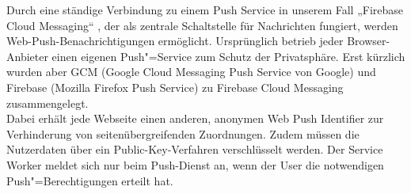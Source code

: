 Durch eine ständige Verbindung zu einem Push Service in unserem Fall „Firebase Cloud Messaging“ , der als zentrale Schaltstelle für Nachrichten fungiert, werden Web-Push-Benachrichtigungen ermöglicht. Ursprünglich betrieb jeder Browser-Anbieter einen eigenen Push"=Service zum Schutz der Privatsphäre. Erst kürzlich wurden aber GCM (Google Cloud Messaging Push Service von Google) und Firebase (Mozilla Firefox Push Service) zu Firebase Cloud Messaging zusammengelegt. \\
Dabei erhält jede Webseite einen anderen, anonymen Web Push Identifier zur Verhinderung von seitenübergreifenden Zuordnungen. Zudem müssen die Nutzerdaten über ein Public-Key-Verfahren verschlüsselt werden. Der Service Worker meldet sich nur beim Push-Dienst an, wenn der User die notwendigen Push"=Berechtigungen erteilt hat. \\


